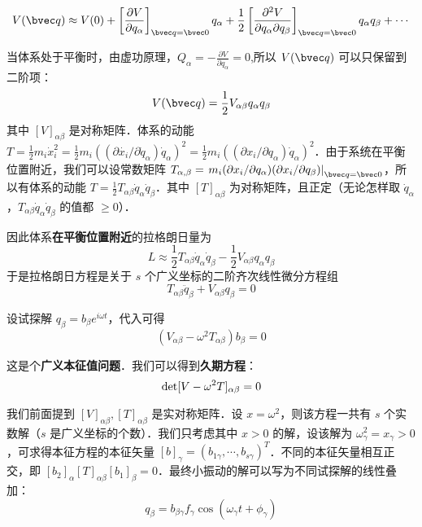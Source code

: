 \begin{equation}
V(\bvec q)\approx V(0)+\left[\frac{\partial V}{\partial q_\alpha}\right]_{\bvec q=\bvec 0} q_\alpha+\frac{1}{2}\left[\frac{\partial^2V}{\partial q_\alpha\partial q_\beta}\right]_{\bvec q=\bvec 0} q_\alpha q_\beta+\cdots
\end{equation}

当体系处于平衡时，由虚功原理，$Q_\alpha=-\frac{\partial V}{\partial q_\alpha}=0$,所以 $V(\bvec q)$ 可以只保留到二阶项：
\begin{equation}
V(\bvec q)=\frac{1}{2}V_{\alpha\beta}q_\alpha q_\beta
\end{equation}
其中 $[V]_{\alpha\beta}$ 是对称矩阵．体系的动能 $T=\frac{1}{2}m_i\dot{x}_i^2=\frac{1}{2}m_i((\partial \dot{x_i} / \partial \dot{q}_\alpha) \dot{q}_\alpha)^2= \frac{1}{2}m_i((\partial x_i/\partial q_\alpha)\dot{q}_\alpha)^2$．由于系统在平衡位置附近，我们可以设常数矩阵 $T_{\alpha,\beta}=\left.m_i(\partial x_i/\partial q_\alpha)(\partial x_i/\partial q_\beta)\right|_{\bvec q=\bvec 0}$，所以有体系的动能 $T=\frac{1}{2}T_{\alpha\beta} \dot{q}_\alpha \dot{q}_\beta$．其中 $[T]_{\alpha\beta}$ 为对称矩阵，且正定（无论怎样取 $\dot{q}_\alpha$，$T_{\alpha\beta} \dot{q}_\alpha \dot{q}_\beta$ 的值都 $\ge0$）．

因此体系\textbf{在平衡位置附近}的拉格朗日量为
\begin{equation}
L\approx\frac{1}{2}T_{\alpha\beta}\dot{q}_\alpha \dot{q}_\beta-\frac{1}{2}V_{\alpha\beta}q_\alpha q_\beta
\end{equation}
于是拉格朗日方程是关于 $s$ 个广义坐标的二阶齐次线性微分方程组
\begin{equation}
T_{\alpha\beta}\ddot{q}_\beta+V_{\alpha\beta}q_\beta=0
\end{equation}

设试探解 $q_\beta=b_\beta e^{i\omega t}$，代入可得
\begin{equation}
(V_{\alpha\beta} - \omega^2 T_{\alpha\beta}) b_\beta = 0
\end{equation}

这是个\textbf{广义本征值问题}．我们可以得到\textbf{久期方程}：
\begin{equation}
{\rm{det}}[V-\omega^2 T]_{\alpha\beta}=0 
\end{equation}

我们前面提到 $[V]_{\alpha\beta},[T]_{\alpha\beta}$ 是实对称矩阵．设 $x=\omega^2$，则该方程一共有 $s$ 个实数解（$s$ 是广义坐标的个数）．我们只考虑其中 $x>0$ 的解，设该解为 $\omega_\gamma^2=x_\gamma>0$，可求得本征方程的本征矢量 $[b]_\gamma=(b_{1\gamma},\cdots,b_{s\gamma})^T$．不同的本征矢量相互正交，即 $[b_2]_{\alpha}[T]_{\alpha\beta} [b_1]_{\beta}=0$．最终小振动的解可以写为不同试探解的线性叠加：
\begin{equation}
q_\beta = b_{\beta\gamma}f_\gamma \cos(\omega_\gamma t + \phi_\gamma)
\end{equation}


